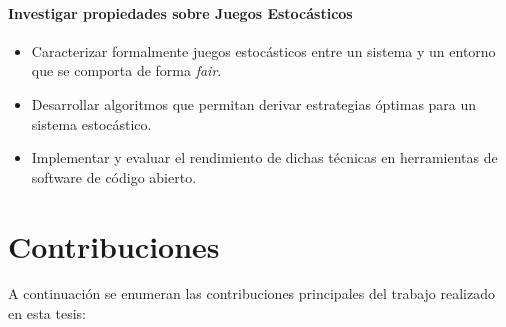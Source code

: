 \paragraph{Investigar propiedades sobre Juegos Estocásticos}
\begin{itemize}
\item Caracterizar formalmente juegos estocásticos entre un sistema y un entorno que se comporta de forma \textit{fair}. 
    
\item Desarrollar algoritmos que permitan derivar estrategias óptimas para un sistema estocástico.

\item Implementar y evaluar el rendimiento de dichas técnicas en herramientas de software de código abierto.
\end{itemize}


\section{Contribuciones}
\label{sec:intro.contribuciones}

A continuación se enumeran las contribuciones principales del trabajo realizado en esta tesis:

